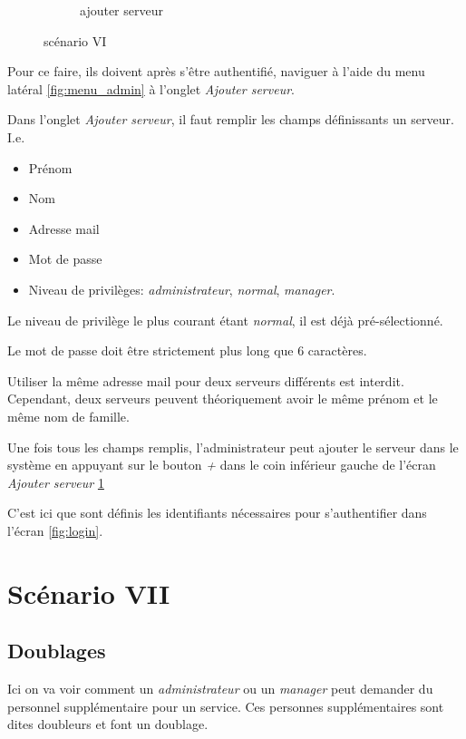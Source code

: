 \begin{figure}[!h]
\begin{subfigure}{.45\textwidth}
            \caption{ajouter serveur}
            \label{fig:ajout_serveur}
        \end{subfigure}
        \caption{scénario VI}
        \label{fig:scen06}
    \end{figure}

    Pour ce faire, ils doivent après s'être authentifié, naviguer à l'aide 
    du menu latéral \ref{fig:menu_admin} à l'onglet \textit{Ajouter serveur}.

    Dans l'onglet \textit{Ajouter serveur}, il faut remplir les champs définissants un serveur. I.e. 
    \smallskip
    \begin{itemize}
        \item Prénom
        \item Nom 
        \item Adresse mail
        \item Mot de passe
        \item Niveau de privilèges: \textit{administrateur}, \textit{normal}, \textit{manager}. 
    \end{itemize}
    \medskip
    Le niveau de privilège le plus courant étant \textit{normal}, il est déjà 
    pré-sélectionné.

    Le mot de passe doit être strictement plus long que 6 caractères.

    Utiliser la même adresse mail pour deux serveurs différents est interdit. 
    Cependant, deux serveurs peuvent théoriquement avoir le même prénom et le même nom de 
    famille.

    Une fois tous les champs remplis, l'administrateur peut ajouter le serveur
    dans le système en appuyant sur le bouton \textit{+} dans le coin inférieur
    gauche de l'écran \textit{Ajouter serveur} \ref{fig:ajout_serveur}

    C'est ici que sont définis les identifiants nécessaires pour s'authentifier dans l'écran \ref{fig:login}.
    \section[Doublages - Scénario VII]{Scénario VII}
        \subsection*{Doublages}
        Ici on va voir comment un \textit{administrateur} ou un \textit{manager} peut demander
        du personnel supplémentaire pour un service. Ces personnes supplémentaires sont dites 
        doubleurs et font un doublage.

